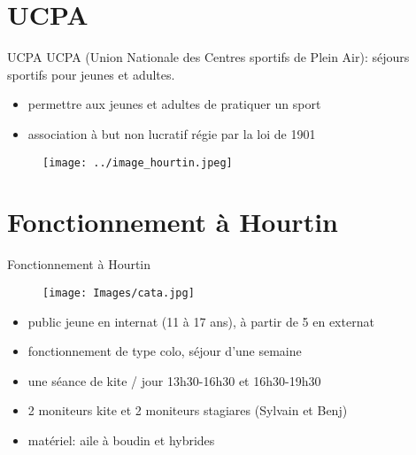 \documentclass[10pt,a4paper]{beamer}
\begin{document}
\section{UCPA}
\begin{frame}{UCPA}
UCPA (Union Nationale des Centres sportifs de Plein Air): séjours sportifs pour jeunes
et adultes.

\begin{itemize}
\item permettre aux jeunes et adultes de pratiquer un sport
\item association à but non lucratif régie par la loi de 1901
\end{itemize}
\begin{figure}
\texttt{[image: ../image\_hourtin.jpeg]} 
\end{figure}
\end{frame}

\section{Fonctionnement à Hourtin}
\begin{frame}{Fonctionnement à  Hourtin}
\begin{figure}
\texttt{[image: Images/cata.jpg]} 
\end{figure}
\begin{itemize}
\item public jeune en internat (11 à 17 ans), à partir de 5 en externat
\item fonctionnement de type colo, séjour d'une semaine 
\item une séance de kite / jour 13h30-16h30 et 16h30-19h30 
\item 2 moniteurs kite et 2 moniteurs stagiares (Sylvain et Benj)
\item matériel: aile à boudin et hybrides
\end{itemize}
\end{frame}
\end{document}
